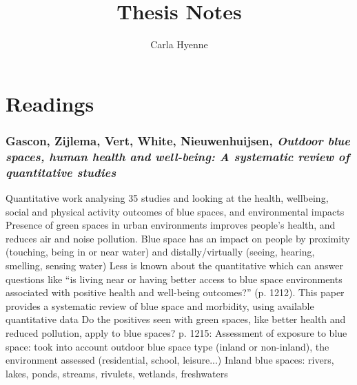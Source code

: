 \documentclass{article}
\title{Thesis Notes}
\author{Carla Hyenne}
\begin{document}
\maketitle

\tableofcontents

\pagebreak

\section{Readings}

\subsubsection{Gascon, Zijlema, Vert, White, Nieuwenhuijsen, \textit{Outdoor blue spaces, human health and well-being: A systematic review of quantitative studies}}

\begin{outline}
	\1 Quantitative work analysing 35 studies and looking at the health, wellbeing, social and physical activity outcomes of blue spaces, and environmental impacts 
	\1 Presence of green spaces in urban environments improves people's health, and reduces air and noise pollution. Blue space has an impact on people by proximity (touching, being in or near water) and distally/virtually (seeing, hearing, smelling, sensing water)
	\1 Less is known about the quantitative which can answer questions like ``is living near or having better access to blue space environments associated with positive health and well-being outcomes?'' (p. 1212). This paper provides a systematic review of blue space and morbidity, using available quantitative data
	\1 Do the positives seen with green spaces, like better health and reduced pollution, apply to blue spaces?
	\1 p. 1215: Assessment of exposure to blue space: took into account outdoor blue space type (inland or non-inland), the environment assessed (residential, school, leisure...)
		\2 Inland blue spaces: rivers, lakes, ponds, streams, rivulets, wetlands, freshwaters
	
\end{outline}
\end{document}
